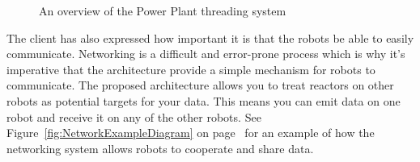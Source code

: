 \documentclass[english,12pt]{scrartcl}
\begin{document}
\begin{figure}[b]
                \caption {An overview of the Power Plant threading system}
                \label{fig:PowerPlantThreadingOverviewDiagram}
            \end{figure}

            The client has also expressed how important it is that the robots be able to easily
            communicate. Networking is a difficult and error-prone process which is why it's
            imperative that the architecture provide a simple mechanism for robots to communicate.
            The proposed architecture allows you to treat reactors on other robots as potential
            targets for your data. This means you can emit data on one robot and receive it on any
            of the other robots. See Figure~\ref{fig:NetworkExampleDiagram} on 
            page~\pageref{fig:NetworkExampleDiagram} for an example of how the networking system
            allows robots to cooperate and share data.
\end{document}

